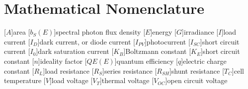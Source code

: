 \appendix
\chapter{Mathematical Nomenclature}

\begin{acronym}
    [$A$]{area}
    [$b_S(E)$]{spectral photon flux density}
    [$E$]{energy}
    [$G$]{irradiance}
    [$I$]{load current}
    [$I_D$]{dark current, or diode current}
    [$I_{PV}$]{photocurrent}
    [$I_{SC}$]{short circuit current}
    [$I_0$]{dark saturation current}
    [$K_B$]{Boltzmann constant}
    [$K_E$]{short circuit constant}
    [$n$]{ideality factor}
    [$QE(E)$]{quantum efficiency}
    [$q$]{electric charge constant}
    [$R_L$]{load resistance}
    [$R_S$]{series resistance}
    [$R_{SH}$]{shunt resistance}
    [$T_C$]{cell temperature}
    [$V$]{load voltage}
    [$V_T$]{thermal voltage}
    [$V_{OC}$]{open circuit voltage}
\end{acronym}